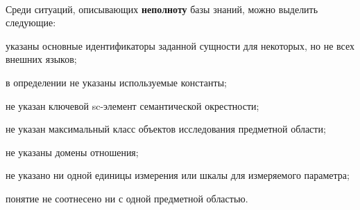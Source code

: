 \begin{frame}{\\}
	\topline
	\justifying
	
	\vspace{10mm}
	Среди ситуаций, описывающих \textbf{неполноту} базы знаний, можно выделить следующие:
		\begin{textitemize}
			\item указаны основные идентификаторы заданной сущности для некоторых, но не всех внешних языков;
			\item в определении не указаны используемые константы;
			\item не указан ключевой sc-элемент семантической окрестности;
			\item не указан максимальный класс объектов исследования предметной области;
			\item не указаны домены отношения;
			\item не указано ни одной единицы измерения или шкалы для измеряемого	параметра;
			\item понятие не соотнесено ни с одной предметной областью.
		\end{textitemize}
\end{frame}

